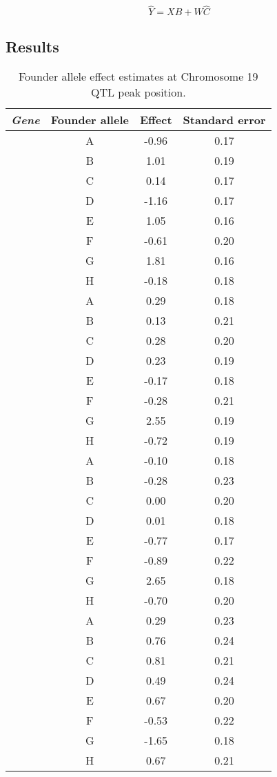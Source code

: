 \documentclass[oneside]{book}
\begin{document}
\begin{equation}\label{eq:fitted}
\hat Y = X\hat B + W \hat C
\end{equation}


\subsection{Results}

\begin{table}[ht]
\caption{Founder allele effect estimates at Chromosome 19 QTL peak position.}\label{tab:effects}
\centering
\begin{tabular}{>{\em}cccc}
  \hline
 Gene & Founder allele & Effect & Standard error \\
  \hline
\multirow{8}{*}{Asah2} & A & -0.96 & 0.17 \\
  & B & 1.01 & 0.19 \\
  & C & 0.14 & 0.17 \\
  & D & -1.16 & 0.17 \\
  & E & 1.05 & 0.16 \\
  & F & -0.61 & 0.20 \\
  & G & 1.81 & 0.16 \\
  & H & -0.18 & 0.18 \\
  \hline
  \multirow{8}{*}{Lipo1} & A & 0.29 & 0.18 \\
  & B & 0.13 & 0.21 \\
  & C & 0.28 & 0.20 \\
  & D & 0.23 & 0.19 \\
  & E & -0.17 & 0.18 \\
  & F & -0.28 & 0.21 \\
  & G & 2.55 & 0.19 \\
  & H & -0.72 & 0.19 \\
  \hline
\multirow{8}{*}{Lipo2} & A & -0.10 & 0.18 \\
  & B & -0.28 & 0.23 \\
  & C & 0.00 & 0.20 \\
  & D & 0.01 & 0.18 \\
  & E & -0.77 & 0.17 \\
  & F & -0.89 & 0.22 \\
  & G & 2.65 & 0.18 \\
  & H & -0.70 & 0.20 \\
   \hline
\multirow{8}{*}{4933413C19Rik} & A & 0.29 & 0.23 \\
  & B & 0.76 & 0.24 \\
  & C & 0.81 & 0.21 \\
  & D & 0.49 & 0.24 \\
  & E & 0.67 & 0.20 \\
  & F & -0.53 & 0.22 \\
  & G & -1.65 & 0.18 \\
  & H & 0.67 & 0.21 \\
   \hline
\end{tabular}
\end{table}
\end{document}
